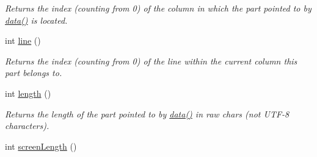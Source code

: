 \begin{DoxyCompactItemize}
\begin{DoxyCompactList}\small\item\em Returns the index (counting from 0) of the column in which the part pointed to by \hyperlink{classxmem_1_1config_1_1third__party_1_1_print_usage_implementation_1_1_line_part_iterator_a4659a652fa20c9aade9d96686ebc91d3}{data()} is located. \end{DoxyCompactList}\item 
\hypertarget{classxmem_1_1config_1_1third__party_1_1_print_usage_implementation_1_1_line_part_iterator_a085991916515dabc0c2350f981ff867e}{int \hyperlink{classxmem_1_1config_1_1third__party_1_1_print_usage_implementation_1_1_line_part_iterator_a085991916515dabc0c2350f981ff867e}{line} ()}\label{classxmem_1_1config_1_1third__party_1_1_print_usage_implementation_1_1_line_part_iterator_a085991916515dabc0c2350f981ff867e}

\begin{DoxyCompactList}\small\item\em Returns the index (counting from 0) of the line within the current column this part belongs to. \end{DoxyCompactList}\item 
\hypertarget{classxmem_1_1config_1_1third__party_1_1_print_usage_implementation_1_1_line_part_iterator_acf67bdaf6acfb4b2c68be776a5c2d04d}{int \hyperlink{classxmem_1_1config_1_1third__party_1_1_print_usage_implementation_1_1_line_part_iterator_acf67bdaf6acfb4b2c68be776a5c2d04d}{length} ()}\label{classxmem_1_1config_1_1third__party_1_1_print_usage_implementation_1_1_line_part_iterator_acf67bdaf6acfb4b2c68be776a5c2d04d}

\begin{DoxyCompactList}\small\item\em Returns the length of the part pointed to by \hyperlink{classxmem_1_1config_1_1third__party_1_1_print_usage_implementation_1_1_line_part_iterator_a4659a652fa20c9aade9d96686ebc91d3}{data()} in raw chars (not U\-T\-F-\/8 characters). \end{DoxyCompactList}\item 
\hypertarget{classxmem_1_1config_1_1third__party_1_1_print_usage_implementation_1_1_line_part_iterator_a3f14008db9127b8423662d5ed69dfd97}{int \hyperlink{classxmem_1_1config_1_1third__party_1_1_print_usage_implementation_1_1_line_part_iterator_a3f14008db9127b8423662d5ed69dfd97}{screen\-Length} ()}\label{classxmem_1_1config_1_1third__party_1_1_print_usage_implementation_1_1_line_part_iterator_a3f14008db9127b8423662d5ed69dfd97}


\end{DoxyCompactItemize}
